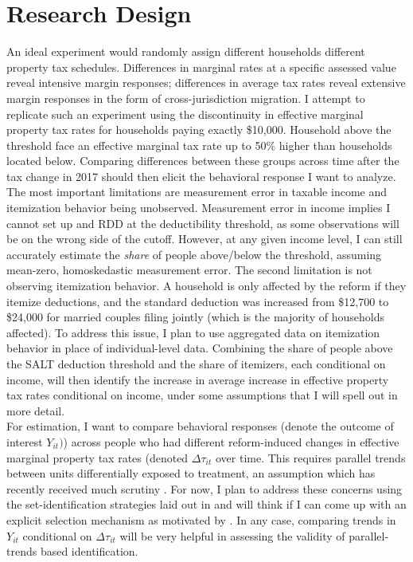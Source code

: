 \documentclass[fleqn,10pt]{olplainarticle}
\begin{document}
\section*{Research Design}
An ideal experiment would randomly assign different households different property tax schedules. Differences in marginal rates at a specific assessed value reveal intensive margin responses; differences in average tax rates reveal extensive margin responses in the form of cross-jurisdiction migration. I attempt to replicate such an experiment using the discontinuity in effective marginal property tax rates for households paying exactly \$10,000. Household above the threshold face an effective marginal tax rate up to 50\% higher than households located below. Comparing differences between these groups across time after the tax change in 2017 should then elicit the behavioral response I want to analyze.\\
The most important limitations are measurement error in taxable income and itemization behavior being unobserved. Measurement error in income implies I cannot set up and RDD at the deductibility threshold, as some observations will be on the wrong side of the cutoff. However, at any given income level, I can still accurately estimate the \textit{share} of people above/below the threshold, assuming mean-zero, homoskedastic measurement error. The second limitation is not observing itemization behavior. A household is only affected by the reform if they itemize deductions, and the standard deduction was increased from \$12,700 to \$24,000 for married couples filing jointly (which is the majority of households affected). To address this issue, I plan to use aggregated data on itemization behavior in place of individual-level data. Combining the share of people above the SALT deduction threshold and the share of itemizers, each conditional on income, will then identify the increase in average increase in effective property tax rates conditional on income, under some assumptions that I will spell out in more detail.\\ 
For estimation, I want to compare behavioral responses (denote the outcome of interest $Y_{it})$) across people who had different reform-induced changes in effective marginal property tax rates (denoted $\Delta \tau_{it}$ over time. This requires parallel trends between units differentially exposed to treatment, an assumption which has recently received much scrutiny \citep{Roth2023, GhanemSantannaWuthrich}. For now, I plan to address these concerns using the set-identification strategies laid out in \cite{Roth2023} and will think if I can come up with an explicit selection mechanism as motivated by \cite{GhanemSantannaWuthrich}. In any case, comparing trends in $Y_{it}$ conditional on $\Delta\tau_{it}$ will be very helpful in assessing the validity of parallel-trends based identification.\\
\end{document}
